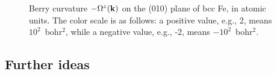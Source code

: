 \documentclass[a4paper,11pt,twoside]{article}
\begin{document}
\begin{figure}[h]
\begin{center}
\caption{Berry curvature $-\Omega^z({\bf k})$ on the (010) plane of
  bcc Fe, in atomic units.  The color scale is as follows:
  a positive value, e.g., 2, means $10^2$~bohr$^2$, while a negative value,
  e.g., -2, means $-10^2$~bohr$^2$.}
\label{fig:fe-curv-slice}
\end{center}
\end{figure}

\subsection*{Further ideas}
\end{document}
